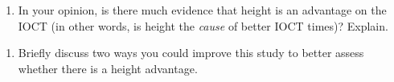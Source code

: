 \documentclass[]{book}
\providecommand{\tightlist}{%
  \setlength{\itemsep}{0pt}\setlength{\parskip}{0pt}}
\begin{document}
\vspace{1in}

\newpage

\begin{enumerate}
\def\labelenumi{\arabic{enumi}.}
\setcounter{enumi}{14}
\tightlist
\item
  In your opinion, is there much evidence that height is an advantage on the IOCT (in other words, is height the \emph{cause} of better IOCT times)? Explain.
\end{enumerate}

\vspace{2in}

\begin{enumerate}
\def\labelenumi{\arabic{enumi}.}
\setcounter{enumi}{15}
\tightlist
\item
  Briefly discuss two ways you could improve this study to better assess whether there is a height advantage.
\end{enumerate}

\vspace{1in}


\end{document}
